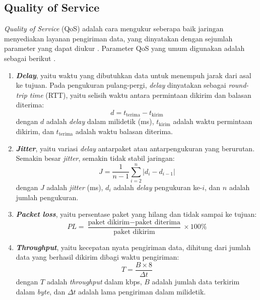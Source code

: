 \subsection{Quality of Service}
\label{subsec:qos}
\textit{Quality of Service} (QoS) adalah cara mengukur seberapa baik jaringan menyediakan layanan pengiriman data, yang dinyatakan dengan sejumlah parameter yang dapat diukur \parencite{rosid2023qos}. Parameter QoS yang umum digunakan adalah sebagai berikut \parencite{etsi1999tiphon,rosid2023qos,basmar2026jamsibuk}.
\begin{enumerate}
    \item \textbf{\textit{Delay}}, yaitu waktu yang dibutuhkan data untuk menempuh jarak dari asal ke tujuan. Pada pengukuran pulang-pergi, \textit{delay} dinyatakan sebagai \textit{round-trip time} (RTT), yaitu selisih waktu antara permintaan dikirim dan balasan diterima:
    \begin{equation}
    d = t_{\mathrm{terima}} - t_{\mathrm{kirim}}
    \label{eq:delay}
    \end{equation}
    dengan $d$ adalah \textit{delay} dalam milidetik (ms), $t_{\mathrm{kirim}}$ adalah waktu permintaan dikirim, dan $t_{\mathrm{terima}}$ adalah waktu balasan diterima.
    \item \textbf{\textit{Jitter}}, yaitu variasi \textit{delay} antarpaket atau antarpengukuran yang berurutan. Semakin besar \textit{jitter}, semakin tidak stabil jaringan:
    \begin{equation}
    J = \frac{1}{n-1}\sum_{i=2}^{n} \left| d_i - d_{i-1} \right|
    \label{eq:jitter}
    \end{equation}
    dengan $J$ adalah \textit{jitter} (ms), $d_i$ adalah \textit{delay} pengukuran ke-$i$, dan $n$ adalah jumlah pengukuran.
    \item \textbf{\textit{Packet loss}}, yaitu persentase paket yang hilang dan tidak sampai ke tujuan:
    \begin{equation}
    PL = \frac{\text{paket dikirim} - \text{paket diterima}}{\text{paket dikirim}} \times 100\%
    \label{eq:packetloss}
    \end{equation}
    \item \textbf{\textit{Throughput}}, yaitu kecepatan nyata pengiriman data, dihitung dari jumlah data yang berhasil dikirim dibagi waktu pengiriman:
    \begin{equation}
    T = \frac{B \times 8}{\Delta t}
    \label{eq:throughput}
    \end{equation}
    dengan $T$ adalah \textit{throughput} dalam kbps, $B$ adalah jumlah data terkirim dalam \textit{byte}, dan $\Delta t$ adalah lama pengiriman dalam milidetik.
\end{enumerate}

